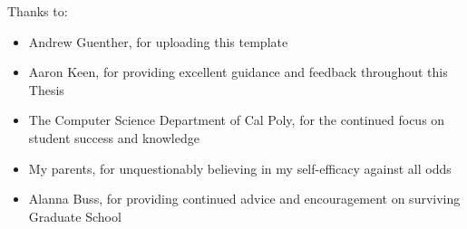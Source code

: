 \noindent
Thanks to:
\begin{itemize}
    \item Andrew Guenther, for uploading this template
    \item Aaron Keen, for providing excellent guidance and feedback throughout this Thesis
    \item The Computer Science Department of Cal Poly, for the continued focus on student success and knowledge
    \item My parents, for unquestionably believing in my self-efficacy against all odds
    \item Alanna Buss, for providing continued advice and encouragement on surviving Graduate School
\end{itemize}
